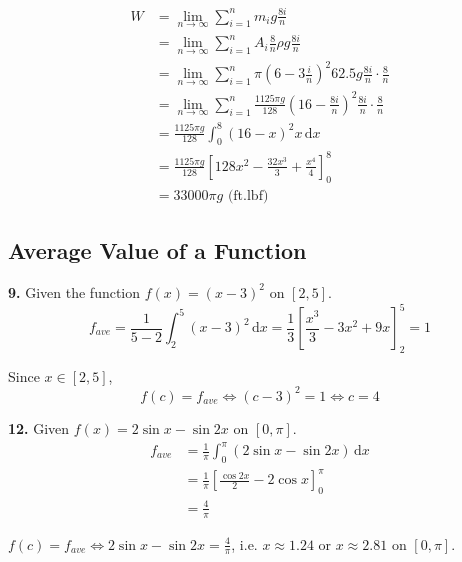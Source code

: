 \documentclass[a4paper,12pt]{article}
\newcommand{\ud}{\,\mathrm{d}}
\begin{document}
\begin{align*}
W&=\lim_{n \to \infty}\sum_{i = 1}^n m_i g\frac{8i}{n}\\
 &=\lim_{n \to \infty}\sum_{i = 1}^n A_i\frac{8}{n}\rho g\frac{8i}{n}\\
 &=\lim_{n \to \infty}\sum_{i = 1}^n
   \pi\left(6 - 3\frac{i}{n}\right)^2 62.5g\frac{8i}{n}\cdot\frac{8}{n}\\
 &=\lim_{n \to \infty}\sum_{i = 1}^n
   \frac{1125\pi g}{128}\left(16 - \frac{8i}{n}\right)^2\frac{8i}{n}\cdot\frac{8}{n}\\
 &=\frac{1125\pi g}{128}\int_0^8\left(16 - x\right)^2 x\ud x\\
 &=\frac{1125\pi g}{128}\left[128x^2 - \frac{32x^3}{3} + \frac{x^4}{4}\right]_0^8\\
 &=33000\pi g\text{ (ft.lbf)}\tag{23}
\end{align*}

\subsection{Average Value of a Function}
\textbf{9. }Given the function $f(x) = (x - 3)^2$ on $[2, 5]$.
\[f_{ave}
= \frac{1}{5 - 2}\int_2^5 (x - 3)^2 \ud x
= \frac{1}{3}\left[\frac{x^3}{3} - 3x^2 + 9x\right]_2^5
= 1\tag{a}\]

Since $x \in [2, 5]$,
\[f(c) = f_{ave} \iff (c - 3)^2 = 1 \iff c = 4\tag{b}\]


\noindent\textbf{12. }Given $f(x) = 2\sin x - \sin 2x$ on $[0, \pi]$.
\begin{align*}
f_{ave} &= \frac{1}{\pi}\int_0^\pi\left(2\sin x - \sin 2x\right)\ud x\\
        &= \frac{1}{\pi}\left[\frac{\cos 2x}{2} - 2\cos x\right]_0^\pi\\
        &= \frac{4}{\pi}
\end{align*}

$f(c) = f_{ave} \iff 2\sin x - \sin 2x = \frac{4}{\pi}$, i.e.
$x \approx 1.24$ or $x \approx 2.81$ on $[0, \pi]$.
\end{document}
